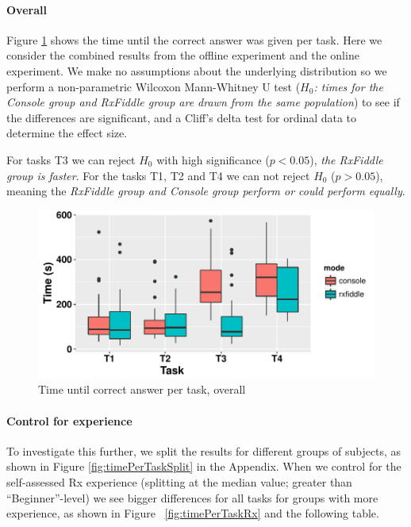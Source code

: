 \paragraph{Overall} Figure%
\ref{fig:timePerTask} shows the time until the correct answer was given
per task.  Here we consider the combined results from the offline experiment
and the online experiment.  We make no assumptions about the underlying
distribution so we perform a non-parametric Wilcoxon Mann-Whitney U test
(\textit{$ H_0 $:  times for the Console group and RxFiddle group are
drawn from the same population}) to see if the differences are
significant, and a Cliff's delta test for ordinal data to determine the
effect size.

\begin{centering}
    
\end{centering}

For tasks T3 we can reject $ H_0 $ with high significance ($ p < 0.05 $),
\emph{the RxFiddle group is faster}.  For the tasks T1, T2 and T4 we can
not reject $ H_0 $ ($ p > 0.05 $), meaning the \emph{RxFiddle group and
Console group perform or could perform equally}.

\begin{figure}[t]
    \includegraphics[width=\columnwidth]{images/timePerTask.pdf}
    \caption{Time until correct answer per task, overall}%
    \label{fig:timePerTask}
\end{figure}

\paragraph{Control for experience} To investigate this further, we split
the results for different groups of subjects, as shown in Figure%
\ref{fig:timePerTaskSplit} in the Appendix.  When we control for the
self-assessed Rx experience (splitting at the median value; greater than
``Beginner''-level) we see bigger differences for all tasks for groups
with more experience, as shown in Figure~%
\ref{fig:timePerTaskRx} and the following table.

